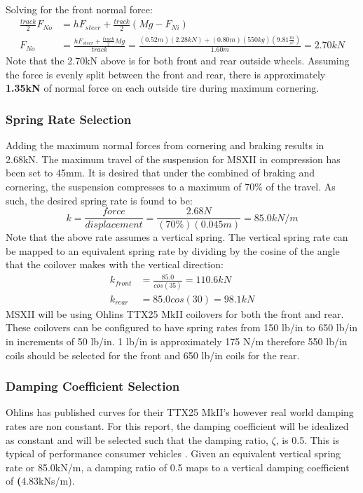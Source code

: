 \documentclass[12pt]{article}
\begin{document}
Solving for the front normal force: 
\begin{equation}
\begin{split}
	\frac{track}{2}F_{No} &= hF_{steer} + \frac{track}{2}(Mg - F_{Ni})\\
	F_{No} &= \frac{hF_{steer} + \frac{track}{2}Mg}{track} = \frac{(0.52m)(2.28kN)+(0.80m)(550kg)\left(9.81\frac{m}{s^2}\right)}{1.60m} = 2.70kN
\end{split}
\end{equation}
Note that the 2.70kN above is for both front and rear outside wheels. Assuming the force is evenly split between the front and rear, there is approximately \textbf{1.35kN} of normal force on each outside tire during maximum cornering. 
\subsubsection{Spring Rate Selection}
Adding the maximum normal forces from cornering and braking results in 2.68kN. The maximum travel of the suspension for MSXII in compression has been set to 45mm. It is desired that under the combined of braking and cornering, the suspension compresses to a maximum of 70\% of the travel. As such, the desired spring rate is found to be: 
\begin{equation}
	k = \frac{force}{displacement} = \frac{2.68N}{(70\%)(0.045m)} = 85.0kN/m
\end{equation}
Note that the above rate assumes a vertical spring. The vertical spring rate can be mapped to an equivalent spring rate by dividing by the cosine of the angle that the coilover makes with the vertical direction: 
\begin{equation}
	\begin{split}
		k_{front} &= \frac{85.0}{cos(35)} = 110.6kN \\
		k_{rear} &= {85.0}{cos(30)} = 98.1kN
	\end{split}
\end{equation}
MSXII will be using Ohlins TTX25 MkII coilovers for both the front and rear. These coilovers can be configured to have spring rates from 150 lb/in to 650 lb/in in increments of 50 lb/in. 1 lb/in is approximately 175 N/m therefore 550 lb/in coils should be selected for the front and 650 lb/in coils for the rear. 

\subsubsection{Damping Coefficient Selection}
Ohlins has published curves for their TTX25 MkII's however real world damping rates are non constant. For this report, the damping coefficient will be idealized as constant and will be selected such that the damping ratio, $\zeta$, is 0.5. This is typical of performance consumer vehicles \cite{dampers}. Given an equivalent vertical spring rate or 85.0kN/m, a damping ratio of 0.5 maps to a vertical damping coefficient of \textbf(4.83kNs/m). 
\end{document}
